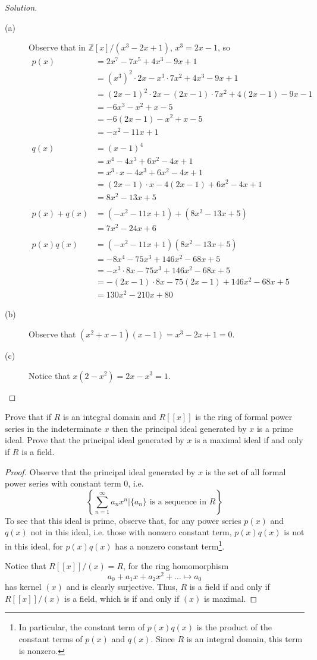\documentclass[12pt,leqno]{book}
\numberwithin{equation}{section}
\newcommand{\question}[2] {\vspace{.25in}\noindent\fbox{#1} #2 \vspace{.10in}}
\theoremstyle{definition}
\begin{document}
\begin{proof}[Solution]\indent
\begin{description}
 \item [(a)] Observe that in $\mathbb{Z}[x]/(x^3-2x+1)$, $x^3=2x-1$, so \begin{align*}p(x)&=2x^7-7x^5+4x^3-9x+1\\&=(x^3)^2\cdot2x-x^3\cdot7x^2+4x^3-9x+1\\&=(2x-1)^2\cdot2x-(2x-1)\cdot7x^2+4(2x-1)-9x-1\\&=-6x^3-x^2+x-5\\&=-6(2x-1)-x^2+x-5\\&=-x^2-11x+1\\\\q(x)&=(x-1)^4\\&=x^4-4x^3+6x^2-4x+1\\&=x^3\cdot x-4x^3+6x^2-4x+1\\&=(2x-1)\cdot x-4(2x-1)+6x^2-4x+1\\&=8x^2-13x+5\\\\p(x)+q(x)&=(-x^2-11x+1)+(8x^2-13x+5)\\&=7x^2-24x+6\\\\p(x)q(x)&=(-x^2-11x+1)(8x^2-13x+5)\\&=-8x^4-75x^3+146x^2-68x+5\\&=-x^3\cdot8x-75x^3+146x^2-68x+5\\&=-(2x-1)\cdot8x-75(2x-1)+146x^2-68x+5\\&=130x^2-210x+80\end{align*}
 \item [(b)] Observe that $(x^2+x-1)(x-1)=x^3-2x+1=0$.
 \item [(c)] Notice that $x(2-x^2)=2x-x^3=1$.\qedhere
\end{description}

\end{proof}

\question{18}{Prove that if $R$ is an integral domain and $R[[x]]$ is the ring of formal power series in the indeterminate $x$ then the principal ideal generated by $x$ is a prime ideal. Prove that the principal ideal generated by $x$ is a maximal ideal if and only if $R$ is a field.}

\begin{proof}
 Observe that the principal ideal generated by $x$ is the set of all formal power series with constant term 0, i.e. \[\left\{\sum_{n=1}^{\infty}a_nx^n|\{a_n\}\text{ is a sequence in }R\right\}\] To see that this ideal is prime, observe that, for any power series $p(x)$ and $q(x)$ not in this ideal, i.e. those with nonzero constant term, $p(x)q(x)$ is not in this ideal, for $p(x)q(x)$ has a nonzero constant term\footnote{In particular, the constant term of $p(x)q(x)$ is the product of the constant terms of $p(x)$ and $q(x)$. Since $R$ is an integral domain, this term is nonzero.}.

Notice that $R[[x]]/(x)=R$, for the ring homomorphism \[a_0+a_1x+a_2x^2+\hdots\mapsto a_0\] has kernel $(x)$ and is clearly surjective. Thus, $R$ is a field if and only if $R[[x]]/(x)$ is a field, which is if and only if $(x)$ is maximal.
\end{proof}
\end{document}
